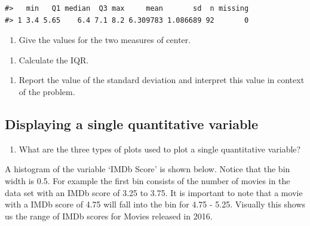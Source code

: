 \documentclass[
]{report}
\providecommand{\tightlist}{%
  \setlength{\itemsep}{0pt}\setlength{\parskip}{0pt}}
\begin{document}
\begin{verbatim}
#>   min   Q1 median  Q3 max     mean       sd  n missing
#> 1 3.4 5.65    6.4 7.1 8.2 6.309783 1.086689 92       0
\end{verbatim}

\begin{enumerate}
\def\labelenumi{\arabic{enumi}.}
\setcounter{enumi}{3}
\tightlist
\item
  Give the values for the two measures of center.
\end{enumerate}

\vspace{0.5in}

\begin{enumerate}
\def\labelenumi{\arabic{enumi}.}
\setcounter{enumi}{4}
\tightlist
\item
  Calculate the IQR.
\end{enumerate}

\vspace{0.5in}

\begin{enumerate}
\def\labelenumi{\arabic{enumi}.}
\setcounter{enumi}{5}
\tightlist
\item
  Report the value of the standard deviation and interpret this value in context of the problem.
  \vspace{1in}
\end{enumerate}

\hypertarget{displaying-a-single-quantitative-variable}{%
\subsection*{Displaying a single quantitative variable}\label{displaying-a-single-quantitative-variable}}

\begin{enumerate}
\def\labelenumi{\arabic{enumi}.}
\setcounter{enumi}{6}
\tightlist
\item
  What are the three types of plots used to plot a single quantitative variable?
\end{enumerate}

\newpage

A histogram of the variable `IMDb Score' is shown below. Notice that the bin width is 0.5. For example the first bin consists of the number of movies in the data set with an IMDb score of 3.25 to 3.75. It is important to note that a movie with a IMDb score of 4.75 will fall into the bin for 4.75 - 5.25. Visually this shows us the range of IMDb scores for Movies released in 2016.
\end{document}
